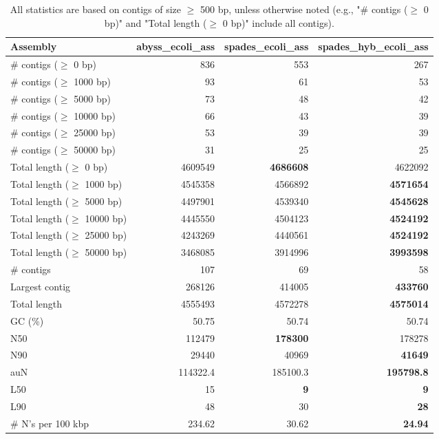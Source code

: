 \documentclass[12pt,a4paper]{article}
\begin{document}
\begin{table}[ht]
\begin{center}
\caption{All statistics are based on contigs of size $\geq$ 500 bp, unless otherwise noted (e.g., "\# contigs ($\geq$ 0 bp)" and "Total length ($\geq$ 0 bp)" include all contigs).}
\begin{tabular}{|l*{3}{|r}|}
\hline
Assembly & abyss\_ecoli\_ass & spades\_ecoli\_ass & spades\_hyb\_ecoli\_ass \\ \hline
\# contigs ($\geq$ 0 bp) & 836 & 553 & 267 \\ \hline
\# contigs ($\geq$ 1000 bp) & 93 & 61 & 53 \\ \hline
\# contigs ($\geq$ 5000 bp) & 73 & 48 & 42 \\ \hline
\# contigs ($\geq$ 10000 bp) & 66 & 43 & 39 \\ \hline
\# contigs ($\geq$ 25000 bp) & 53 & 39 & 39 \\ \hline
\# contigs ($\geq$ 50000 bp) & 31 & 25 & 25 \\ \hline
Total length ($\geq$ 0 bp) & 4609549 & {\bf 4686608} & 4622092 \\ \hline
Total length ($\geq$ 1000 bp) & 4545358 & 4566892 & {\bf 4571654} \\ \hline
Total length ($\geq$ 5000 bp) & 4497901 & 4539340 & {\bf 4545628} \\ \hline
Total length ($\geq$ 10000 bp) & 4445550 & 4504123 & {\bf 4524192} \\ \hline
Total length ($\geq$ 25000 bp) & 4243269 & 4440561 & {\bf 4524192} \\ \hline
Total length ($\geq$ 50000 bp) & 3468085 & 3914996 & {\bf 3993598} \\ \hline
\# contigs & 107 & 69 & 58 \\ \hline
Largest contig & 268126 & 414005 & {\bf 433760} \\ \hline
Total length & 4555493 & 4572278 & {\bf 4575014} \\ \hline
GC (\%) & 50.75 & 50.74 & 50.74 \\ \hline
N50 & 112479 & {\bf 178300} & 178278 \\ \hline
N90 & 29440 & 40969 & {\bf 41649} \\ \hline
auN & 114322.4 & 185100.3 & {\bf 195798.8} \\ \hline
L50 & 15 & {\bf 9} & {\bf 9} \\ \hline
L90 & 48 & 30 & {\bf 28} \\ \hline
\# N's per 100 kbp & 234.62 & 30.62 & {\bf 24.94} \\ \hline
\end{tabular}
\end{center}
\end{table}
\end{document}
